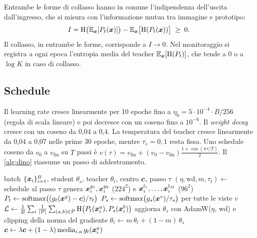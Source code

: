Entrambe le forme di collasso hanno in comune l'indipendenza dell'uscita dall'ingresso, che si
misura con l'informazione mutua tra immagine e prototipo:
\begin{equation}
  I=\mathrm{H}\bigl(\mathbb{E}_{\bm{x}}[P_t(\bm{x})]\bigr)-\mathbb{E}_{\bm{x}}\bigl[\mathrm{H}(P_t(\bm{x}))\bigr]\;\ge\;0 .
  \label{eq:dino-mi}
\end{equation}
Il collasso, in entrambe le forme, corrisponde a $I\to0$. Nel monitoraggio si registra a ogni
epoca l'entropia media del teacher $\mathbb{E}_{\bm{x}}[\mathrm{H}(P_t)]$, che tende a $0$ o a $\log K$ in
caso di collasso.

\subsection{Schedule}

Il learning rate cresce linearmente per 10 epoche fino a $\eta_0=5\cdot10^{-4}\cdot B/256$
(regola di scala lineare) e poi decresce con un coseno fino a $10^{-6}$. Il \emph{weight decay}
cresce con un coseno da 0,04 a 0,4. La temperatura del teacher cresce linearmente da 0,04 a 0,07
nelle prime 30 epoche, mentre $\tau_s=0{,}1$ resta fissa. Uno schedule coseno da $v_0$ a
$v_{\mathrm{fin}}$ su $T$ passi è
$v(\tau)=v_{\mathrm{fin}}+(v_0-v_{\mathrm{fin}})\frac{1+\cos(\pi\tau/T)}{2}$. Il
\cref{alg:dino} riassume un passo di addestramento.

\begin{algorithm}[t]
  \caption{Un passo di addestramento DINO}
  \label{alg:dino}
  \begin{algorithmic}[1]
    \Require batch $\{\bm{x}_i\}_{i=1}^{B}$, student $\theta_s$, teacher $\theta_t$, centro $\bm{c}$, passo $\tau$
    \State $(\eta,\mathrm{wd},m,\tau_t)\gets$ schedule al passo $\tau$
      \State genera $\bm{x}_i^{g_1},\bm{x}_i^{g_2}$ ($224^2$) e $\bm{x}_i^{l_1},\dots,\bm{x}_i^{l_M}$ ($96^2$)
    \EndFor
    \State $P_t\gets\operatorname{softmax}\bigl((g_t(\bm{x}^{g})-\bm{c})/\tau_t\bigr)$ 
    \State $P_s\gets\operatorname{softmax}\bigl(g_s(\bm{x}^{v})/\tau_s\bigr)$ per tutte le viste $v$
    \State $\mathcal{L}\gets\frac1B\sum_i\frac{1}{\left\lvert \mathcal{P} \right\rvert}\sum_{(a,b)\in\mathcal{P}}\mathrm{H}\bigl(P_t(\bm{x}_i^{a}),P_s(\bm{x}_i^{b})\bigr)$
    \State aggiorna $\theta_s$ con AdamW($\eta$, wd) e clipping della norma del gradiente
    \State $\theta_t\gets m\,\theta_t+(1-m)\,\theta_s$
    \State $\bm{c}\gets\lambda\bm{c}+(1-\lambda)\,\mathrm{media}_{i,a}\,g_t(\bm{x}_i^{a})$
  \end{algorithmic}
\end{algorithm}

